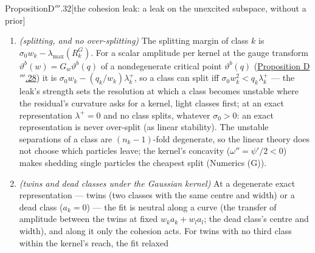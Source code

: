 \begin{thm}{Proposition}{D$'''$.32}[the cohesion leak: a leak on the unexcited subspace, without a
prior]
\begin{enumerate}[label=\textup{(\roman*)}]
    multiplicity $n_k - 1$,
    $R^G_k := G^{1/2}\langle r\nabla^2_\vartheta\tilde\Phi(\cdot\,;\vartheta_k)\rangle_\rho G^{1/2}$ the residual
    curvature; on the class means it is $-\tilde A_w$, the linearised unregularised weighted $K$-atom flow, the leak
    absent. The separations are the directions in which the plant does not see the network ($D\fhat = 0$ on them),
    and where $H_L(w)\succ0$ they are all of them: the leak acts exactly on the unexcited subspace. At an exact
    representation the separations of class $k$ decay at $\sigma_0w_k$ and the collective modes at $h_j(w)$ (the
    eigenvalues of $H_L(w)$), for every $w\in W$; the class means' stationary response to a persistent force $F$ is
    $\tilde A_w^{-1}F$ --- the adaptive prior's (\hyperref[res:thmDppp:31]{Proposition D$'''$.31}(i)--(iii)): no leak
    opposes it. The restoring force is linear only near the class: under the compact kernel the pair force
    $\psi(d^2/R^2)d$ is largest at $d = R/\sqrt7$ and vanishes at $R$, so a separation pushed beyond $R$ is not
    restored.
  \item \emph{(splitting, and no over-splitting)} The splitting margin of class $k$ is
    $\sigma_0w_k - \lambda_{\max}(R^G_k)$. For a scalar amplitude per kernel at the gauge transform
    $\vartheta^b(w) = G_w\vartheta^b(q)$ of a nondegenerate critical point $\vartheta^b(q)$
    (\hyperref[res:thmDppp:28]{Proposition D$'''$.28}) it is $\sigma_0w_k - (q_k/w_k)\lambda^+_k$, so a class can
    split iff $\sigma_0w_k^2 < q_k\lambda^+_k$ --- the leak's strength sets the resolution at which a class becomes
    unstable where the residual's curvature asks for a kernel, light classes first; at an exact representation
    $\lambda^+ = 0$ and no class splits, whatever $\sigma_0 > 0$: an exact representation is never over-split (as
    linear stability). The unstable separations of a class are $(n_k - 1)$-fold degenerate, so the linear theory does
    not choose which particles leave; the kernel's concavity ($\omega'' = \psi'/2 < 0$) makes shedding single
    particles the cheapest split (Numerics (G)).
  \item \emph{(twins and dead classes under the Gaussian kernel)} At a degenerate exact representation --- twins (two
    classes with the same centre and width) or a dead class ($a_k = 0$) --- the fit is neutral along a curve (the
    transfer of amplitude between the twins at fixed $w_ka_k + w_la_l$; the dead class's centre and width), and along
    it only the cohesion acts. For twins with no third class within the kernel's reach, the fit relaxed

\end{enumerate}
\end{thm}
